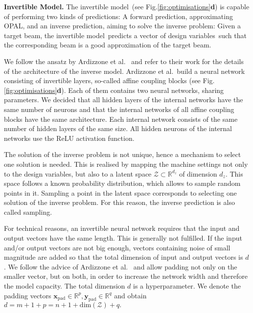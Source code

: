\documentclass[a4paper, 12pt, version-1-compatibility]{article}
\def\invertiblemodel{invertible model}
\def\opal{OPAL}
\def\dvars{design variables}
\newcommand{\figref}[1]{Fig.\xspace\ref{#1}}
\newcommand{\myvec}[1]{\mathbf{#1}}
\begin{document}

{\bf Invertible Model.}
 The \invertiblemodel\ (see \figref{fig:optimisations}\textbf{d}) is capable of performing two kinds of predictions: A forward prediction, approximating \opal, and an inverse prediction, aiming to solve the inverse problem: Given a target beam, the \invertiblemodel\ predicts a vector of \dvars\ such that the corresponding beam is a good approximation of the target beam. 


We follow the ansatz by Ardizzone et al.~\cite{Ardizzone2018} and refer to their work for the details of the architecture of the inverse model. 
Ardizzone et al.\ build a neural network consisting of invertible layers, so-called affine coupling blocks (see \figref{fig:optimisations}\textbf{d}). Each of them contains two neural networks, sharing parameters. We decided that all hidden layers of the internal networks have the same number of neurons and that the internal networks of all affine coupling blocks have the same architecture. Each internal network consists of the same number of hidden layers of the same size. All hidden neurons of the internal networks use the ReLU activation function.

The solution of the inverse problem is not unique, hence a mechanism to select one solution is needed. This is realised by mapping the machine settings not only to the \dvars, but also to a latent space $\mathcal{Z} \subset \mathbb{R}^{d_z}$ of dimension $d_z$. This space follows a known probability distribution, which allows to sample random points in it. Sampling a point in the latent space corresponds to selecting one solution of the inverse problem. For this reason, the inverse prediction is also called sampling.

For technical reasons, an invertible neural network requires that the input and output vectors have the same length. This is generally not fulfilled.  If the input and/or output vectors are not big enough, vectors containing noise of small magnitude are added so that the total dimension of input and output vectors is $d$. We follow the advice of Ardizzone et al.~\cite{Ardizzone2018} and allow padding not only on the smaller vector, but on both, in order to increase the network width and therefore the model capacity. The total dimension $d$ is a hyperparameter. We denote the padding vectors $\myvec{x}_\mathrm{pad} \in \mathbb{R}^p, \myvec{y}_\mathrm{pad} \in \mathbb{R}^q$ and obtain
$d = m + 1 + p = n + 1 + \mathrm{dim}(\mathcal{Z}) + q.$
\end{document}
